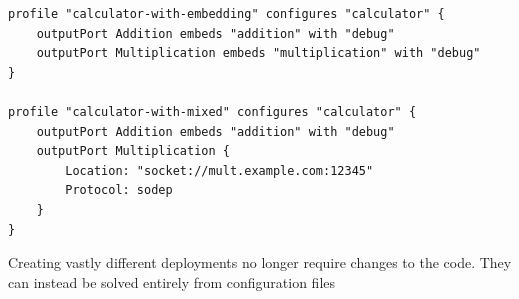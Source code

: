 \begin{listing}[H]
\begin{verbatim}
profile "calculator-with-embedding" configures "calculator" {
    outputPort Addition embeds "addition" with "debug"
    outputPort Multiplication embeds "multiplication" with "debug"
}

profile "calculator-with-mixed" configures "calculator" {
    outputPort Addition embeds "addition" with "debug"
    outputPort Multiplication {
        Location: "socket://mult.example.com:12345"
        Protocol: sodep
    }
}
\end{verbatim}

\caption{Creating vastly different deployments no longer require changes to the
code. They can instead be solved entirely from configuration files}

\label{lst:conf_trivial_embedding}

\end{listing}

